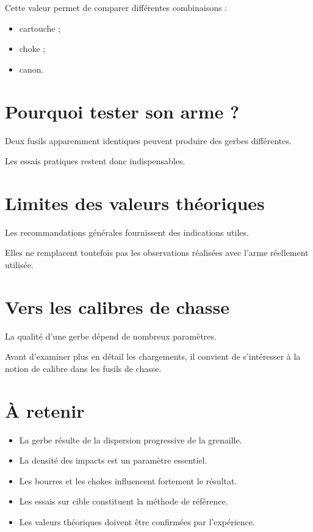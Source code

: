 Cette valeur permet de comparer différentes combinaisons :

\begin{itemize}
    \item cartouche ;
    \item choke ;
    \item canon.
\end{itemize}

\section{Pourquoi tester son arme ?}

Deux fusils apparemment identiques peuvent produire des gerbes différentes.

Les essais pratiques restent donc indispensables.

\section{Limites des valeurs théoriques}

Les recommandations générales fournissent des indications utiles.

Elles ne remplacent toutefois pas les observations réalisées avec l'arme
réellement utilisée.

\section{Vers les calibres de chasse}

La qualité d'une gerbe dépend de nombreux paramètres.

Avant d'examiner plus en détail les chargements, il convient de s'intéresser à
la notion de calibre dans les fusils de chasse.

\section{À retenir}

\begin{aretenir}

\begin{itemize}
    \item La gerbe résulte de la dispersion progressive de la grenaille.
    \item La densité des impacts est un paramètre essentiel.
    \item Les bourres et les chokes influencent fortement le résultat.
    \item Les essais sur cible constituent la méthode de référence.
    \item Les valeurs théoriques doivent être confirmées par l'expérience.
\end{itemize}

\end{aretenir}
